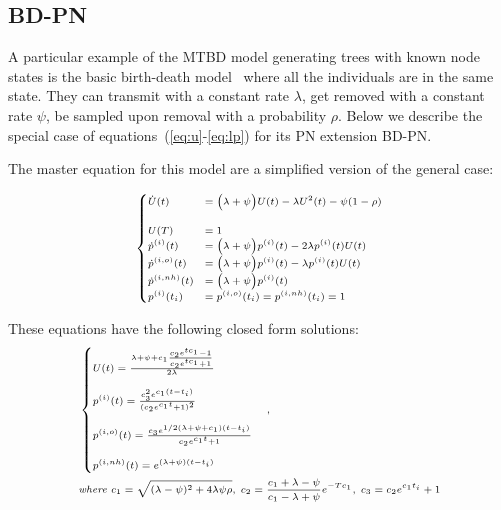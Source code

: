 \documentclass[a4paper,10pt]{article}
\begin{document}
\subsection{BD-PN}
A particular example of the MTBD model generating trees with known node states is the basic birth-death model~\citep{Stadler2009} where all the individuals are in the same state. They can transmit with a constant rate $\lambda$, get removed with a constant rate $\psi$, be sampled upon removal with a probability $\rho$. Below we describe the special case of equations~(\ref{eq:u}-\ref{eq:lp}) for its PN extension BD-PN.

The master equation for this model are a simplified version of the general case:

\begin{equation}
\scriptsize
\begin{cases}
\dot{U}(t) &= \Big(\lambda + \psi\Big) U(t) - \lambda U^2(t) - \psi (1 - \rho)\\\\
U(T) &=  1\\
\dot{p}^{(i)}(t) &=  \Big(\lambda + \psi\Big) p^{(i)}(t) - 2 \lambda p^{(i)}(t)U(t)\\
\dot{p}^{(i,o)}(t) &=  \Big(\lambda + \psi\Big) p^{(i)}(t) - \lambda p^{(i)}(t)U(t)\\
\dot{p}^{(i,nh)}(t) &=  \Big(\lambda + \psi\Big) p^{(i)}(t)\\
p^{(i)}(t_i) &= p^{(i,o)}(t_i) = p^{(i,nh)}(t_i) = 1
\end{cases}
\end{equation}


These equations have the following closed form solutions:
\begin{equation}
\scriptsize
\begin{split}
&\begin{cases}
U(t) = \frac{\lambda + \psi + c_1 \frac{c_2 e^{t c_1} - 1}{c_2 e^{tc_1} + 1}}{2\lambda}\\
\\
p^{(i)}(t) = \frac{c_3^2 e^{c_1 (t - t_i)}}{(c_2e^{c_1 t} + 1)^2} \\
\\
p^{(i,o)}(t) =  \frac{c_3 e^{1/2 (\lambda + \psi + c_1)(t - t_i)}}{c_2e^{c_1 t} + 1} \\
\\
p^{(i,nh)}(t) =  e^{(\lambda + \psi)(t - t_i)}
\end{cases},\\
& \textit{where } c_1 = \sqrt{(\lambda - \psi)^2 + 4 \lambda\psi\rho},\; c_2 = \frac{c_1 + \lambda - \psi}{c_1 - \lambda + \psi}e^{-Tc_1},\; c_3 = c_2 e^{c_1 t_i} + 1
\end{split}
\end{equation}
\end{document}
